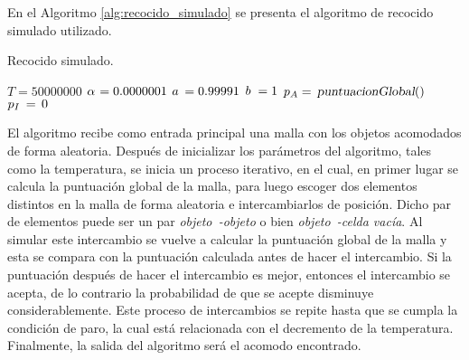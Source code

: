 En el Algoritmo \ref{alg:recocido_simulado} se presenta el algoritmo de recocido simulado utilizado.
%
\begin{center}
\begin{minipage}{0.98\textwidth}
\setlength{\interspacetitleruled}{5pt}
\begin{algorithm}[H]
	\caption{Recocido simulado.}%
	\label{alg:recocido_simulado}%
	\OneQuarterBlankLine
	\HalfBlankLine
	\TwoBlankLines
	$T = \num{50000000}$\;
	$\mathrlap{\alpha}\hphantom{T} = 0.0000001$\;
	$\mathrlap{a}\hphantom{T} = 0.99991$\;
	$\mathrlap{b}\hphantom{T} = 1$\;
	\TwoBlankLines
	$p_A =\, \textsl{puntuacionGlobal}()$\;
	$\mathrlap{p_I}\hphantom{p_A} =\, 0$\;
	\TwoBlankLines
	\HalfBlankLine
\end{algorithm}
\end{minipage}
\end{center}
%
El algoritmo recibe como entrada principal una malla con los objetos acomodados de forma aleatoria.
Después de inicializar los parámetros del algoritmo, tales como la temperatura, se inicia un proceso iterativo, en el cual, en primer lugar se calcula la puntuación global de la malla, para luego escoger dos elementos distintos en la malla de forma aleatoria e intercambiarlos de posición.
Dicho par de elementos puede ser un par \textsl{objeto~-objeto} o bien \textsl{objeto~-celda\! vacía}.
Al simular este intercambio se vuelve a calcular la puntuación global de la malla y esta se compara con la puntuación calculada antes de hacer el intercambio.
Si la puntuación después de hacer el intercambio es mejor, entonces el intercambio se acepta, de lo contrario la probabilidad de que se acepte disminuye considerablemente.
Este proceso de intercambios se repite hasta que se cumpla la condición de paro, la cual está relacionada con el decremento de la temperatura.
Finalmente, la salida del algoritmo será el acomodo encontrado.


